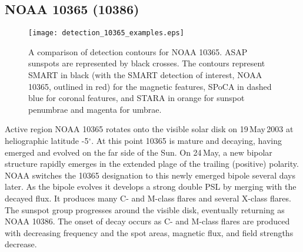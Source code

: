 \subsection{NOAA 10365 (10386)}\label{noaa_10365}

\begin{figure}[!t]
\centerline{\texttt{[image: detection\_10365\_examples.eps]}}
\caption[NOAA 10365 detection contours.]{A comparison of detection contours for NOAA 10365. ASAP sunspots are represented by black crosses. The contours represent SMART in black (with the SMART detection of interest, NOAA 10365, outlined in red) for the magnetic features, SPoCA in dashed blue for coronal features, and STARA in orange for sunspot penumbrae and magenta for
umbrae.}
\label{detection10365compare}
\end{figure}

Active region NOAA 10365 rotates onto the visible solar disk on 19\,May\,2003 at
heliographic latitude -5$^{\circ}$. At this point 10365 is mature and decaying,
having emerged and evolved on the far side of the Sun. On 24\,May, a new
bipolar structure rapidly emerges in the extended plage of the trailing
(positive) polarity. \gls{NOAA} switches the 10365 designation to this newly emerged
bipole several days later. As the bipole evolves it develops a strong double \gls{PSL}
by merging with the decayed flux. It produces many C- and M-class flares
and several X-class flares. The sunspot group progresses around the visible disk,
eventually returning as NOAA 10386. The onset of decay occurs as C- and M-class
flares are produced with decreasing frequency and the spot areas, magnetic flux,
and field strengths decrease.

